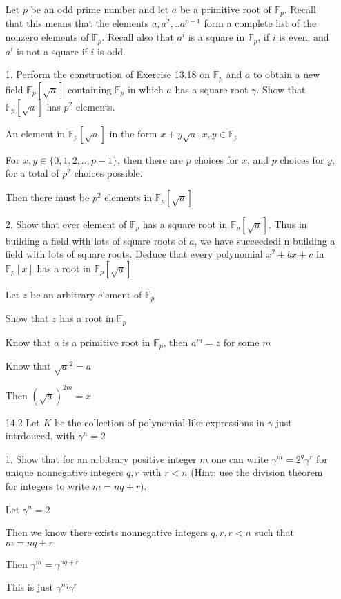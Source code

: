 \documentclass[12pt]{article}
\begin{document}
\begin{itemize}
	Let $p$ be an odd prime number and let $a$ be a primitive root of $\mathbb{F}_p$. Recall that this means that the elements $a, a^2, .. a^{p-1}$ form a complete list of the nonzero elements of $\mathbb{F}_p$. Recall also that $a^i$ is a square in $\mathbb{F}_p$, if $i$ is even, and $a^i$ is not a square if $i$ is odd.

1. Perform the construction of Exercise 13.18 on $\mathbb{F}_p$ and $a$ to obtain a new field $\mathbb{F}_p[\sqrt{a}]$ containing $\mathbb{F}_p$ in which $a$ has a square root $\gamma$. Show that $\mathbb{F}_p[\sqrt{a}]$ has $p^2$ elements.

An element in $\mathbb{F}_p[\sqrt{a}]$ in the form $x+y\sqrt{a}, x,y \in \mathbb{F}_p$

For $x,y \in \{0,1,2,..,p-1\}$, then there are $p$ choices for $x$, and $p$ choices for $y$, for a total of $p^2$ choices possible.

Then there must be $p^2$ elements in $\mathbb{F}_p[\sqrt{a}]$

2. Show that ever element of $\mathbb{F}_p$ has a square root in $\mathbb{F}_p[\sqrt{a}]$. Thus in building a field with lots of square roots of $a$, we have succeededi n building a field with lots of square roots. Deduce that every polynomial $x^2 + bx + c$ in $\mathbb{F}_p[x]$ has a root in $\mathbb{F}_p[\sqrt{a}]$

Let $z$ be an arbitrary element of $\mathbb{F}_p$

Show that $z$ has a root in $\mathbb{F}_p$

Know that $a$ is a primitive root in $\mathbb{F}_p$, then $a^m = z$ for some $m$

Know that $\sqrt{a}^2 = a$

Then $(\sqrt{a})^{2m} = x$

\newpage
\item[14.2]
	Let $K$ be the collection of polynomial-like expressions in $\gamma$ just intrdouced, with $\gamma^n = 2$

	1. Show that for an arbitrary positive integer $m$ one can write $\gamma^m = 2^q\gamma^r$ for unique nonnegative integers $q,r$ with $r< n$ (Hint: use the division theorem for integers to write $m = nq + r)$.

	Let $\gamma^n = 2$

	Then we know there exists nonnegative integers $q, r, r < n$ such that $m = nq + r$

	Then $\gamma^m = \gamma^{nq+r}$

	This is just $\gamma^{nq} \gamma^{r}$


\end{itemize}
\end{document}
